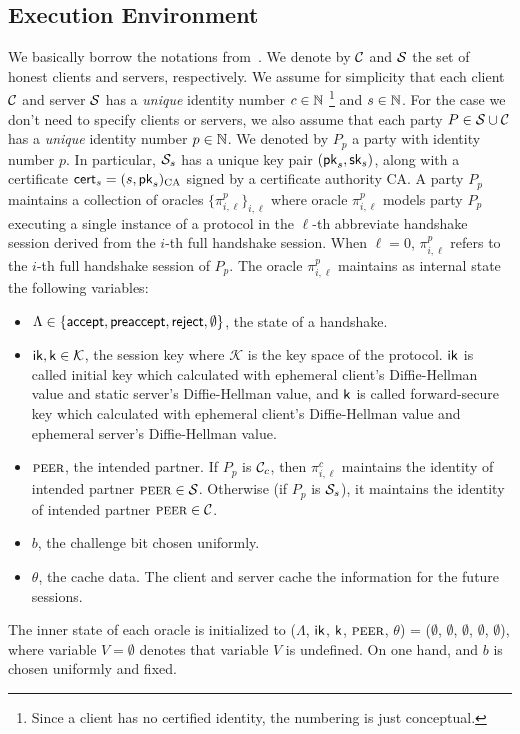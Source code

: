 \subsection{Execution Environment} \label{sec:exec_env_party}
We basically borrow the notations
from~\cite{JKSS12:ACCE,KPW13:SACCE}.
We denote by $\mathcal{C}$ and $\mathcal{S}$ the set of honest
clients and servers, respectively.
We assume for simplicity that each client $\mathcal{C}$
and server $\mathcal{S}$ has a \textit{unique} identity
number $c \in \mathbb{N}$
\footnote{Since a client has no certified identity,
the numbering is just conceptual.}
and $s \in \mathbb{N}$.
For the case we don't need to specify clients or
servers, we also assume that each party
$P \in \mathcal{S} \cup \mathcal{C}$ has a \textit{unique}
identity number $p \in \mathbb{N}$.
We denoted by $P_p$ a party with identity number $p$.
In particular, $\mathcal{S}_s$ has a unique key pair
$(\mathsf{pk}_s, \mathsf{sk}_s)$, along with a certificate
$\mathsf{cert}_s=(s,\mathsf{pk}_s)_{\text{CA}}$ signed by a certificate
authority CA.
A party $P_p$ maintains a collection of oracles
$\{\pi^p_{i,\ell }\}_{i,\ell}$ where oracle
$\pi^p_{i, \ell}$ models party $P_p$ executing a single
instance of a protocol in the $\ell$-th abbreviate
handshake session derived from  the $i$-th full
handshake session.
When $\ell=0$, $\pi^p_{i,\ell}$ refers to the $i$-th
full handshake session of $P_p$.
The oracle $\pi^p_{i, \ell}$ maintains as internal
state the following variables:

\begin{itemize}
 \item{$\Lambda \in \{\mathsf{accept}, \mathsf{preaccept}, \mathsf{reject},
 \emptyset\}$, the state of a handshake.}

 \item{$\mathsf{ik}, \mathsf{k} \in \mathcal{K}$, the session key
 where $\mathcal{K}$ is the key space of the protocol.
 $\mathsf{ik}$ is called initial key which calculated with
 ephemeral client's Diffie-Hellman value and static
 server's Diffie-Hellman value, and $\mathsf{k}$ is called
 forward-secure key which calculated with ephemeral
 client's Diffie-Hellman value and ephemeral server's
 Diffie-Hellman value.}

 \item{$\textsc{peer}$, the intended partner. If $P_p$ is
 $\mathcal{C}_c$, then $\pi^c_{i,\ell}$ maintains the
 identity of intended partner $\textsc{peer} \in \mathcal{S}$.
 Otherwise (if $P_p$ is $\mathcal{S}_s$), it maintains
 the identity of intended partner $\textsc{peer} \in \mathcal{C}$.}

 \item{$b$, the challenge bit chosen uniformly.}

 \item{$\theta$, the cache data. The client and server
 cache the information for the future sessions.}
\end{itemize}
The inner state of each oracle is initialized to
($\Lambda$, $\mathsf{ik}$, $\mathsf{k}$, $\textsc{peer}$, $\theta$) = ($\emptyset$,
$\emptyset$, $\emptyset$, $\emptyset$, $\emptyset$), where
variable $V=\emptyset$ denotes that variable $V$
is undefined.
On one hand, and $b$ is chosen uniformly and fixed.


